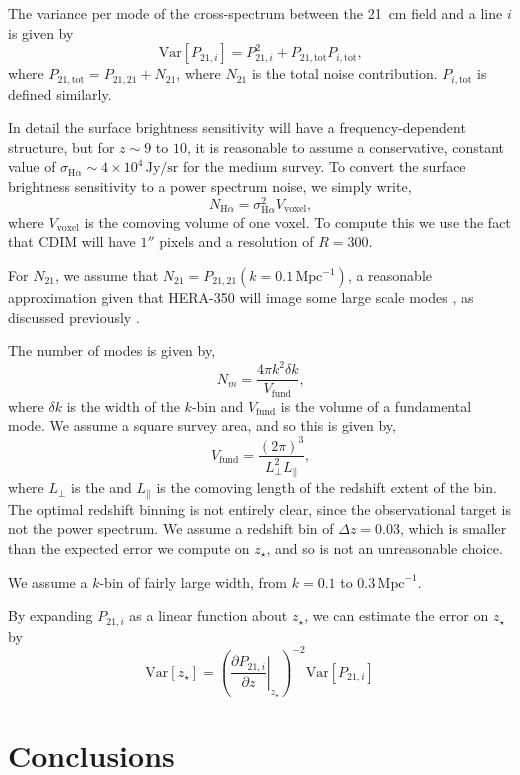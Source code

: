 \documentclass[a4paper,fleqn,usenatbib]{mnras}
\newcommand{\beq}{\begin{equation}}
\newcommand{\eeq}{\end{equation}}
\newcommand{\Ha}{\ensuremath{\text{H}\alpha}}
\newcommand{\Mpc}{\ensuremath{\text{Mpc}}}
\newcommand{\zst}{\ensuremath{z_{\star}}}
\newcommand{\Var}[1]{\mathrm{Var}[#1]}
\begin{document}
The variance per mode of the cross-spectrum between the 21~cm field and a line
$i$ is given by \citep[e.g.][]{2007ApJ...660.1030F}
\beq \label{eq:var_xps}
\Var{P_{21,i}} = P_{21,i}^2 + 
                                  P_{21,\text{tot}} P_{i,\text{tot}}\text{,}
\eeq
where $P_{21,\text{tot}} = P_{21,21} + N_{21}$, where $N_{21}$ is the total
noise contribution. $P_{i,\text{tot}}$ is defined similarly.

In detail the surface brightness sensitivity will have a frequency-dependent
structure, but for $z\sim9$ to $10$, it is reasonable to assume a
conservative, constant value of
$\sigma_{\Ha}\sim4\times10^4\,\text{Jy}/\text{sr}$ for the medium survey. To
convert the surface brightness sensitivity to a power spectrum noise, we simply
write,
\beq \label{eq:ps_}
N_{\Ha} = \sigma_{\Ha}^2 V_{\text{voxel}}\text{,}
\eeq 
where $V_{\text{voxel}}$ is the comoving volume of one voxel. To compute this
we use the fact that CDIM will have $1''$ pixels and a resolution of $R=300$.

For
$N_{21}$, we assume that $N_{21} = P_{21,21}(k=0.1\,\text{Mpc}^{-1})$, a
reasonable approximation given that HERA-350 will image some large scale modes
\citep{2017PASP..129d5001D}, as discussed previously \citep{2018ApJ...867...26B}.

The number of modes is given by,
\beq \label{eq:nmodes}
N_m = \frac{4\pi k^2 \delta k}{V_{\text{fund}}}\text{,}
\eeq
where $\delta k$ is the width of the $k$-bin and $V_{\text{fund}}$ is the
volume of a fundamental mode. We assume a square survey area, and so this is
given by,
\beq \label{eq:fund}
V_{\text{fund}} = \frac{(2 \pi)^3}{L_{\perp}^2 L_{\parallel}}\text{,}
\eeq
where $L_{\perp}$ is the  and $L_{\parallel}$ is the comoving
length of the redshift extent of the bin. The optimal redshift binning is not
entirely clear, since the observational target is not the power spectrum. We
assume a redshift bin of $\Delta z = 0.03$, which is smaller than the expected
error we compute on \zst{}, and so is not an unreasonable choice. 

We assume a $k$-bin of fairly large width, from $k=0.1$ to $0.3\,\Mpc^{-1}$.

By expanding $P_{21,i}$ as a linear function about \zst{}, we can estimate the
error on \zst{} by
\beq \label{eq:error_on_zst}
\Var{\zst} = \left(\left.\frac{\partial P_{21,i}}{\partial z}\right|_{\zst}\right)^{-2} \Var{P_{21,i}}
\eeq

\section{Conclusions} \label{sec:conclusions}
\end{document}
